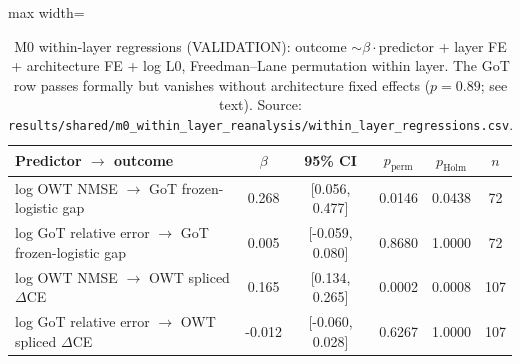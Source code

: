 \begin{table}[t]
\centering
\small
\caption{M0 within-layer regressions (VALIDATION): outcome $\sim\beta\cdot$predictor + layer FE + architecture FE + log L0, Freedman--Lane permutation within layer. The GoT row passes formally but vanishes without architecture fixed effects ($p=0.89$; see text). Source: \texttt{results/\allowbreak{}shared/\allowbreak{}m0\_within\_layer\_reanalysis/\allowbreak{}within\_layer\_regressions.csv}.}
\label{tab:m0}
\begin{adjustbox}{max width=\linewidth}
\begin{tabular}{lccccc}
\toprule
Predictor $\rightarrow$ outcome & $\beta$ & 95\% CI & $p_{\text{perm}}$ & $p_{\text{Holm}}$ & $n$ \\
\midrule
log OWT NMSE $\rightarrow$ GoT frozen-logistic gap & 0.268 & [0.056, 0.477] & 0.0146 & 0.0438 & 72 \\
log GoT relative error $\rightarrow$ GoT frozen-logistic gap & 0.005 & [-0.059, 0.080] & 0.8680 & 1.0000 & 72 \\
log OWT NMSE $\rightarrow$ OWT spliced $\Delta$CE & 0.165 & [0.134, 0.265] & 0.0002 & 0.0008 & 107 \\
log GoT relative error $\rightarrow$ OWT spliced $\Delta$CE & -0.012 & [-0.060, 0.028] & 0.6267 & 1.0000 & 107 \\
\bottomrule
\end{tabular}
\end{adjustbox}
\end{table}
